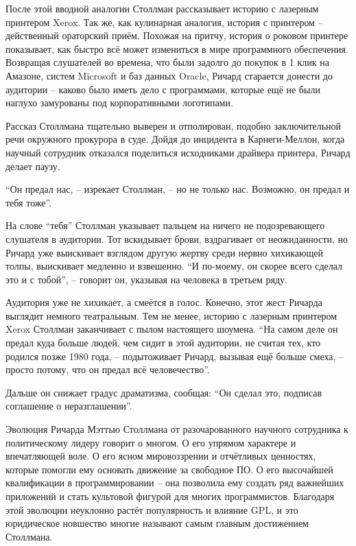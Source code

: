 После этой вводной аналогии Столлман рассказывает историю с лазерным принтером Xerox. Так же, как кулинарная аналогия, история с принтером -- действенный ораторский приём. Похожая на притчу, история о роковом принтере показывает, как быстро всё может измениться в мире программного обеспечения. Возвращая слушателей во времена, что были задолго до покупок в 1 клик на Амазоне, систем Microsoft и баз данных Oracle, Ричард старается донести до аудитории -- каково было иметь дело с программами, которые ещё не были наглухо замурованы под корпоративными логотипами.

Рассказ Столлмана тщательно выверен и отполирован, подобно заключительной речи окружного прокурора в суде. Дойдя до инцидента в Карнеги-Меллон, когда научный сотрудник отказался поделиться исходниками драйвера принтера, Ричард делает паузу.

``Он предал нас, -- изрекает Столлман, -- но не только нас. Возможно, он предал и тебя тоже''.

На слове ``тебя'' Столлман указывает пальцем на ничего не подозревающего слушателя в аудитории. Тот вскидывает брови, вздрагивает от неожиданности, но Ричард уже выискивает взглядом другую жертву среди нервно хихикающей толпы, выискивает медленно и взвешенно. ``И по-моему, он скорее всего сделал это и с тобой'', -- говорит он, указывая на человека в третьем ряду. 

Аудитория уже не хихикает, а смеётся в голос. Конечно, этот жест Ричарда выглядит немного театральным. Тем не менее, историю с лазерным принтером Xerox Столлман заканчивает с пылом настоящего шоумена. ``На самом деле он предал куда больше людей, чем сидит в этой аудитории, не считая тех, кто родился позже 1980 года, -- подытоживает Ричард, вызывая ещё больше смеха, -- просто потому, что он предал всё человечество''.

Дальше он снижает градус драматизма, сообщая:  ``Он сделал это, подписав соглашение о неразглашении''.

Эволюция Ричарда Мэттью Столлмана от разочарованного научного сотрудника к политическому лидеру говорит о многом. О его упрямом характере и впечатляющей воле. О его ясном мировоззрении и отчётливых ценностях, которые помогли ему основать движение за свободное ПО. О его высочайшей квалификации в программировании -- она позволила ему создать ряд важнейших приложений и стать культовой фигурой для многих программистов. Благодаря этой эволюции неуклонно растёт популярность и влияние GPL, и это юридическое новшество многие называют самым главным достижением Столлмана.

